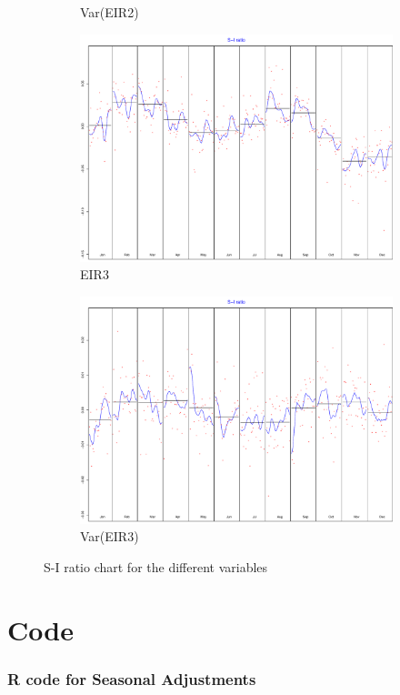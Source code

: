 \documentclass[12pt,a4paper,oneside]{book}
\begin{document}
\begin{figure}[H]
\begin{subfigure}{.5\textwidth}
  \caption{Var(EIR2)}
\end{subfigure}
\begin{subfigure}{.5\textwidth}
  \centering
  \includegraphics[width=.8\linewidth]{Graphs/S-I_7.pdf}
  \caption{EIR3}
\end{subfigure}
\begin{subfigure}{.5\textwidth}
  \centering
  \includegraphics[width=.8\linewidth]{Graphs/S-I_8.pdf}
  \caption{Var(EIR3)}
\end{subfigure}
\caption{S-I ratio chart for the different variables}
\label{fig:S-I seasonal correction RJDemetra}
\end{figure}






\chapter*{Code}
\subsection*{R code for Seasonal Adjustments}
\end{document}
